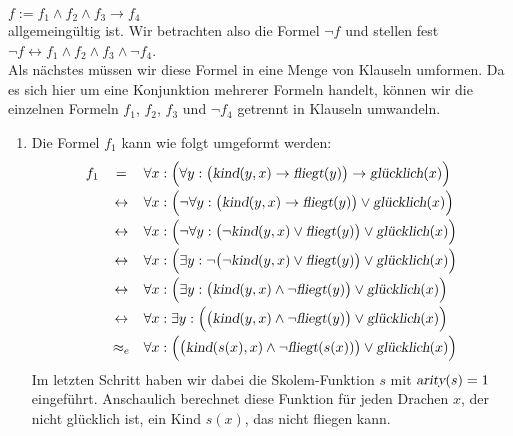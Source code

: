 \\[0.2cm]
\hspace*{1.3cm} 
$f := f_1 \wedge f_2 \wedge f_3 \rightarrow f_4$ 
\\[0.2cm]
allgemeingültig ist.  Wir betrachten also die Formel $\neg f$ und stellen fest \\[0.2cm]
\hspace*{1.3cm} $\neg f \leftrightarrow f_1 \wedge f_2 \wedge f_3 \wedge \neg f_4$. \\[0.2cm]
Als nächstes müssen wir diese Formel in eine Menge von Klauseln umformen.
Da es sich hier um eine Konjunktion mehrerer Formeln handelt, können wir 
die einzelnen Formeln 
 $f_1$, $f_2$, $f_3$ und  $\neg f_4$  getrennt in Klauseln umwandeln.
\begin{enumerate}
\item Die Formel $f_1$ kann wie folgt umgeformt werden:
 $$ 
  \begin{array}{lcl}
    f_1 & =           & \forall x:\Bigl(\forall y: \big(\textsl{kind}(y,x)
    \rightarrow \textsl{fliegt}(y)\big) \rightarrow \textsl{glücklich}(x) \Bigr) \\[0.2cm]
    &\leftrightarrow & \forall x: \Bigl(\neg \forall y: \big( \textsl{kind}(y,x) \rightarrow \textsl{fliegt}(y)\big) \vee \textsl{glücklich}(x) \Bigr)\\[0.2cm]
    &\leftrightarrow & \forall x: \Bigl(\neg \forall y: \big( \neg \textsl{kind}(y,x) \vee \textsl{fliegt}(y)\big) \vee \textsl{glücklich}(x) \Bigr)\\[0.2cm]
    &\leftrightarrow & \forall x: \Bigl(\exists y: \neg \big( \neg \textsl{kind}(y,x) \vee \textsl{fliegt}(y)\big) \vee \textsl{glücklich}(x) \Bigr)\\[0.2cm]
    &\leftrightarrow & \forall x: \Bigl( \exists y: \big(\textsl{kind}(y,x) \wedge \neg  \textsl{fliegt}(y)\big) \vee \textsl{glücklich}(x) \Bigr)\\[0.2cm]
    &\leftrightarrow & \forall x:  \exists y: \Bigl(\big( \textsl{kind}(y,x) \wedge \neg  \textsl{fliegt}(y)\big) \vee \textsl{glücklich}(x) \Bigr)\\[0.2cm]
    &\approx_e & \forall x: \Bigl(\big( \textsl{kind}(s(x),x) \wedge \neg  \textsl{fliegt}(s(x))\big) \vee \textsl{glücklich}(x) \Bigr)\\
  \end{array}
     $$
      Im letzten Schritt haben wir dabei die Skolem-Funktion $s$ mit 
      $\textsl{arity}(s) = 1$ eingeführt.  Anschaulich berechnet diese Funktion für jeden
      Drachen $x$, der nicht glücklich ist, ein Kind $s(x)$, das nicht fliegen kann.

\end{enumerate}
